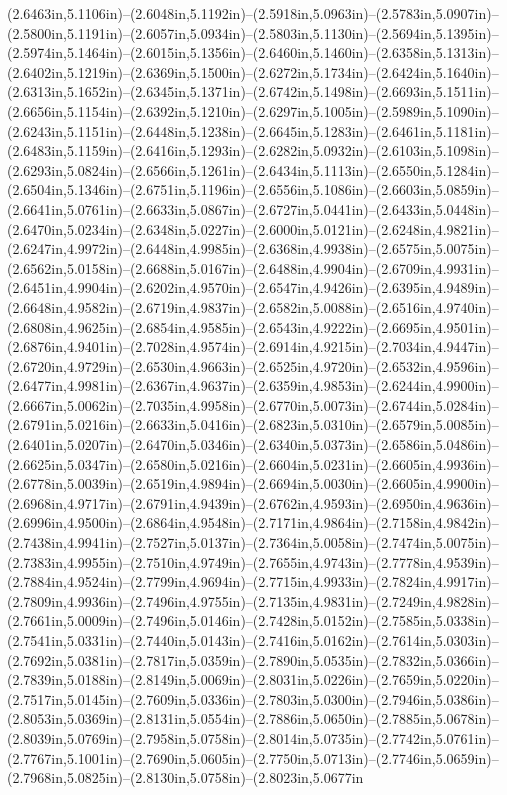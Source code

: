 (2.6463in,5.1106in)--(2.6048in,5.1192in)--(2.5918in,5.0963in)--(2.5783in,5.0907in)--(2.5800in,5.1191in)--(2.6057in,5.0934in)--(2.5803in,5.1130in)--(2.5694in,5.1395in)--(2.5974in,5.1464in)--(2.6015in,5.1356in)--(2.6460in,5.1460in)--(2.6358in,5.1313in)--(2.6402in,5.1219in)--(2.6369in,5.1500in)--(2.6272in,5.1734in)--(2.6424in,5.1640in)--(2.6313in,5.1652in)--(2.6345in,5.1371in)--(2.6742in,5.1498in)--(2.6693in,5.1511in)--(2.6656in,5.1154in)--(2.6392in,5.1210in)--(2.6297in,5.1005in)--(2.5989in,5.1090in)--(2.6243in,5.1151in)--(2.6448in,5.1238in)--(2.6645in,5.1283in)--(2.6461in,5.1181in)--(2.6483in,5.1159in)--(2.6416in,5.1293in)--(2.6282in,5.0932in)--(2.6103in,5.1098in)--(2.6293in,5.0824in)--(2.6566in,5.1261in)--(2.6434in,5.1113in)--(2.6550in,5.1284in)--(2.6504in,5.1346in)--(2.6751in,5.1196in)--(2.6556in,5.1086in)--(2.6603in,5.0859in)--(2.6641in,5.0761in)--(2.6633in,5.0867in)--(2.6727in,5.0441in)--(2.6433in,5.0448in)--(2.6470in,5.0234in)--(2.6348in,5.0227in)--(2.6000in,5.0121in)--(2.6248in,4.9821in)--(2.6247in,4.9972in)--(2.6448in,4.9985in)--(2.6368in,4.9938in)--(2.6575in,5.0075in)--(2.6562in,5.0158in)--(2.6688in,5.0167in)--(2.6488in,4.9904in)--(2.6709in,4.9931in)--(2.6451in,4.9904in)--(2.6202in,4.9570in)--(2.6547in,4.9426in)--(2.6395in,4.9489in)--(2.6648in,4.9582in)--(2.6719in,4.9837in)--(2.6582in,5.0088in)--(2.6516in,4.9740in)--(2.6808in,4.9625in)--(2.6854in,4.9585in)--(2.6543in,4.9222in)--(2.6695in,4.9501in)--(2.6876in,4.9401in)--(2.7028in,4.9574in)--(2.6914in,4.9215in)--(2.7034in,4.9447in)--(2.6720in,4.9729in)--(2.6530in,4.9663in)--(2.6525in,4.9720in)--(2.6532in,4.9596in)--(2.6477in,4.9981in)--(2.6367in,4.9637in)--(2.6359in,4.9853in)--(2.6244in,4.9900in)--(2.6667in,5.0062in)--(2.7035in,4.9958in)--(2.6770in,5.0073in)--(2.6744in,5.0284in)--(2.6791in,5.0216in)--(2.6633in,5.0416in)--(2.6823in,5.0310in)--(2.6579in,5.0085in)--(2.6401in,5.0207in)--(2.6470in,5.0346in)--(2.6340in,5.0373in)--(2.6586in,5.0486in)--(2.6625in,5.0347in)--(2.6580in,5.0216in)--(2.6604in,5.0231in)--(2.6605in,4.9936in)--(2.6778in,5.0039in)--(2.6519in,4.9894in)--(2.6694in,5.0030in)--(2.6605in,4.9900in)--(2.6968in,4.9717in)--(2.6791in,4.9439in)--(2.6762in,4.9593in)--(2.6950in,4.9636in)--(2.6996in,4.9500in)--(2.6864in,4.9548in)--(2.7171in,4.9864in)--(2.7158in,4.9842in)--(2.7438in,4.9941in)--(2.7527in,5.0137in)--(2.7364in,5.0058in)--(2.7474in,5.0075in)--(2.7383in,4.9955in)--(2.7510in,4.9749in)--(2.7655in,4.9743in)--(2.7778in,4.9539in)--(2.7884in,4.9524in)--(2.7799in,4.9694in)--(2.7715in,4.9933in)--(2.7824in,4.9917in)--(2.7809in,4.9936in)--(2.7496in,4.9755in)--(2.7135in,4.9831in)--(2.7249in,4.9828in)--(2.7661in,5.0009in)--(2.7496in,5.0146in)--(2.7428in,5.0152in)--(2.7585in,5.0338in)--(2.7541in,5.0331in)--(2.7440in,5.0143in)--(2.7416in,5.0162in)--(2.7614in,5.0303in)--(2.7692in,5.0381in)--(2.7817in,5.0359in)--(2.7890in,5.0535in)--(2.7832in,5.0366in)--(2.7839in,5.0188in)--(2.8149in,5.0069in)--(2.8031in,5.0226in)--(2.7659in,5.0220in)--(2.7517in,5.0145in)--(2.7609in,5.0336in)--(2.7803in,5.0300in)--(2.7946in,5.0386in)--(2.8053in,5.0369in)--(2.8131in,5.0554in)--(2.7886in,5.0650in)--(2.7885in,5.0678in)--(2.8039in,5.0769in)--(2.7958in,5.0758in)--(2.8014in,5.0735in)--(2.7742in,5.0761in)--(2.7767in,5.1001in)--(2.7690in,5.0605in)--(2.7750in,5.0713in)--(2.7746in,5.0659in)--(2.7968in,5.0825in)--(2.8130in,5.0758in)--(2.8023in,5.0677in